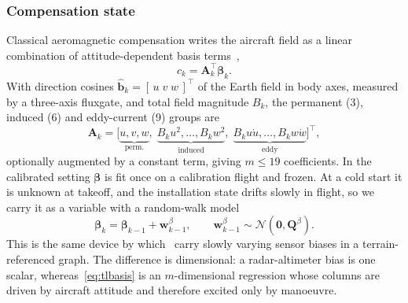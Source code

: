 \subsubsection{Compensation state}
Classical aeromagnetic compensation writes the aircraft field as a linear
combination of attitude-dependent basis
terms~\cite{tolles1950,leliak1961,bickel1979},
\begin{equation}
c_k=\mathbf{A}_k^{\top}\boldsymbol{\beta}_k .
\label{eq:tl}
\end{equation}
With direction cosines $\hat{\mathbf{b}}_k=[\,u\;v\;w\,]^{\top}$ of the Earth
field in body axes, measured by a three-axis fluxgate, and total field magnitude
$B_k$, the permanent (3), induced (6) and eddy-current (9) groups are
\begin{equation}
\mathbf{A}_k=\big[\underbrace{u,v,w}_{\text{perm.}},\;
\underbrace{B_ku^2,\dots,B_kw^2}_{\text{induced}},\;
\underbrace{B_ku\dot u,\dots,B_kw\dot w}_{\text{eddy}}\big]^{\top},
\label{eq:tlbasis}
\end{equation}
optionally augmented by a constant term, giving $m\le19$ coefficients.
In the calibrated setting $\boldsymbol{\beta}$ is fit once on a calibration
flight and frozen. At a cold start it is unknown at takeoff, and the
installation state drifts slowly in flight, so we carry it as a variable with a
random-walk model
\begin{equation}
\boldsymbol{\beta}_{k}=\boldsymbol{\beta}_{k-1}+\mathbf{w}^{\beta}_{k-1},
\qquad \mathbf{w}^{\beta}_{k-1}\sim\mathcal{N}(\mathbf{0},\mathbf{Q}^{\beta}).
\label{eq:betawalk}
\end{equation}
This is the same device by which~\cite{park2023,park2024} carry slowly varying
sensor biases in a terrain-referenced graph. The difference is dimensional: a
radar-altimeter bias is one scalar, whereas~\eqref{eq:tlbasis} is an
$m$-dimensional regression whose columns are driven by aircraft attitude and
therefore excited only by manoeuvre.

